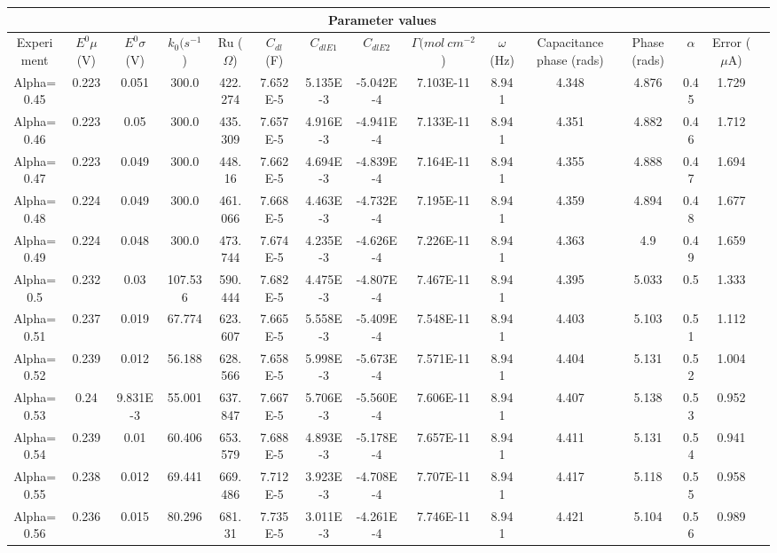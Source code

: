 \documentclass[preview]{standalone}
\begin{document}
\begin{center}
\begin{tabular}{|c|c|c|c|c|c|c|c|c|c|c|c|c|c|c|}
\hline
\multicolumn{14}{|c|}{Parameter values}\\ 
\hline
Experiment & $E^0 \mu$ (V) & $E^0 \sigma$ (V) & $k_0 (s^{-1}$) & Ru ($\Omega$) & $C_{dl}$ (F) & $C_{dlE1}$ & $C_{dlE2}$ & $\Gamma (mol\:cm^{-2}$) & $\omega$ (Hz) & Capacitance phase (rads) & Phase (rads) & $\alpha$ & Error ($\mu$A)\\
\hline
Alpha=0.45 & 0.223 & 0.051 & 300.0 & 422.274 & 7.652E-5 & 5.135E-3 & -5.042E-4 & 7.103E-11 & 8.941 & 4.348 & 4.876 & 0.45 & 1.729\\
\hline
Alpha=0.46 & 0.223 & 0.05 & 300.0 & 435.309 & 7.657E-5 & 4.916E-3 & -4.941E-4 & 7.133E-11 & 8.941 & 4.351 & 4.882 & 0.46 & 1.712\\
\hline
Alpha=0.47 & 0.223 & 0.049 & 300.0 & 448.16 & 7.662E-5 & 4.694E-3 & -4.839E-4 & 7.164E-11 & 8.941 & 4.355 & 4.888 & 0.47 & 1.694\\
\hline
Alpha=0.48 & 0.224 & 0.049 & 300.0 & 461.066 & 7.668E-5 & 4.463E-3 & -4.732E-4 & 7.195E-11 & 8.941 & 4.359 & 4.894 & 0.48 & 1.677\\
\hline
Alpha=0.49 & 0.224 & 0.048 & 300.0 & 473.744 & 7.674E-5 & 4.235E-3 & -4.626E-4 & 7.226E-11 & 8.941 & 4.363 & 4.9 & 0.49 & 1.659\\
\hline
Alpha=0.5 & 0.232 & 0.03 & 107.536 & 590.444 & 7.682E-5 & 4.475E-3 & -4.807E-4 & 7.467E-11 & 8.941 & 4.395 & 5.033 & 0.5 & 1.333\\
\hline
Alpha=0.51 & 0.237 & 0.019 & 67.774 & 623.607 & 7.665E-5 & 5.558E-3 & -5.409E-4 & 7.548E-11 & 8.941 & 4.403 & 5.103 & 0.51 & 1.112\\
\hline
Alpha=0.52 & 0.239 & 0.012 & 56.188 & 628.566 & 7.658E-5 & 5.998E-3 & -5.673E-4 & 7.571E-11 & 8.941 & 4.404 & 5.131 & 0.52 & 1.004\\
\hline
Alpha=0.53 & 0.24 & 9.831E-3 & 55.001 & 637.847 & 7.667E-5 & 5.706E-3 & -5.560E-4 & 7.606E-11 & 8.941 & 4.407 & 5.138 & 0.53 & 0.952\\
\hline
Alpha=0.54 & 0.239 & 0.01 & 60.406 & 653.579 & 7.688E-5 & 4.893E-3 & -5.178E-4 & 7.657E-11 & 8.941 & 4.411 & 5.131 & 0.54 & 0.941\\
\hline
Alpha=0.55 & 0.238 & 0.012 & 69.441 & 669.486 & 7.712E-5 & 3.923E-3 & -4.708E-4 & 7.707E-11 & 8.941 & 4.417 & 5.118 & 0.55 & 0.958\\
\hline
Alpha=0.56 & 0.236 & 0.015 & 80.296 & 681.31 & 7.735E-5 & 3.011E-3 & -4.261E-4 & 7.746E-11 & 8.941 & 4.421 & 5.104 & 0.56 & 0.989\\

\end{tabular}
\end{center}
\end{document}
